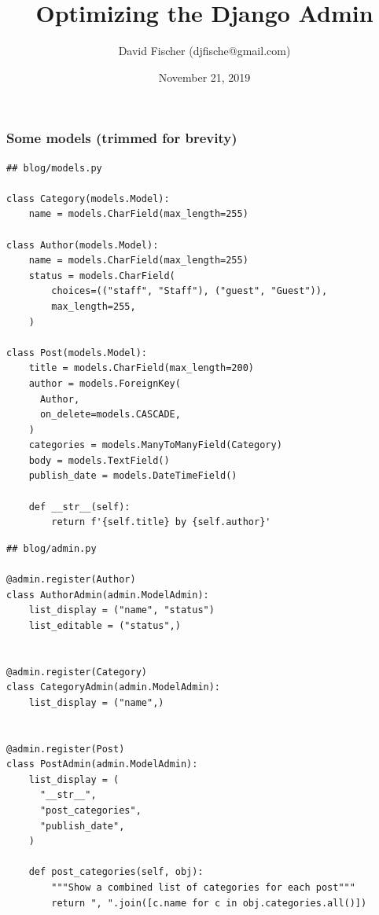 \documentclass[aspectratio=169]{beamer}
\title{Optimizing the Django Admin}
\author{David Fischer (djfische@gmail.com)}
\date{November 21, 2019}
\begin{document}
\maketitle


\begin{frame}[fragile]
\frametitle{Some models (trimmed for brevity)}

\begin{multicols}{2}

{\tiny
\begin{verbatim}
## blog/models.py

class Category(models.Model):
    name = models.CharField(max_length=255)

class Author(models.Model):
    name = models.CharField(max_length=255)
    status = models.CharField(
        choices=(("staff", "Staff"), ("guest", "Guest")),
        max_length=255,
    )

class Post(models.Model):
    title = models.CharField(max_length=200)
    author = models.ForeignKey(
      Author, 
      on_delete=models.CASCADE,
    )
    categories = models.ManyToManyField(Category)
    body = models.TextField()
    publish_date = models.DateTimeField()

    def __str__(self):
        return f'{self.title} by {self.author}'
\end{verbatim}
} 

\columnbreak

{\tiny
\begin{verbatim}
## blog/admin.py

@admin.register(Author)
class AuthorAdmin(admin.ModelAdmin):
    list_display = ("name", "status")
    list_editable = ("status",)


@admin.register(Category)
class CategoryAdmin(admin.ModelAdmin):
    list_display = ("name",)


@admin.register(Post)
class PostAdmin(admin.ModelAdmin):
    list_display = (
      "__str__",
      "post_categories", 
      "publish_date",
    )

    def post_categories(self, obj):
        """Show a combined list of categories for each post"""
        return ", ".join([c.name for c in obj.categories.all()])
\end{verbatim}
}

\end{multicols}

\end{frame}
\end{document}
